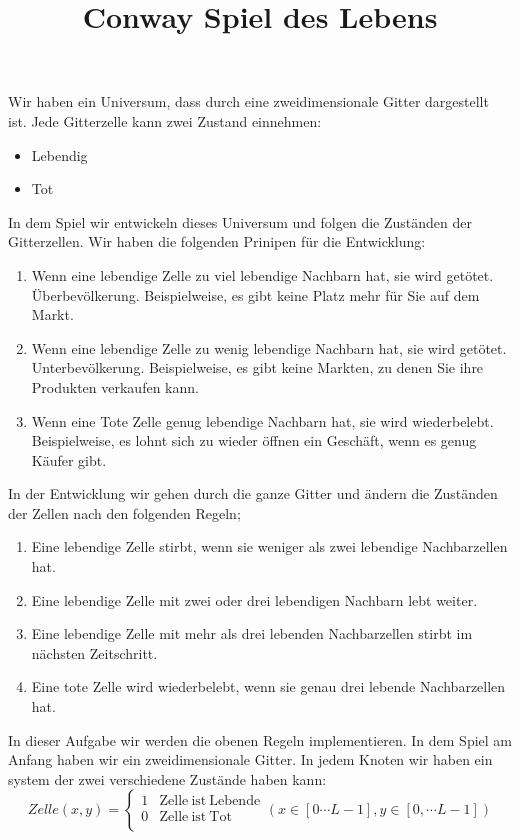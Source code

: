 \documentclass{article}[12pt]
\title{Conway Spiel des Lebens}
\begin{document}
\maketitle
Wir haben ein Universum, dass durch eine zweidimensionale Gitter dargestellt ist. Jede Gitterzelle kann 
zwei Zustand einnehmen:
\begin{itemize}
\item Lebendig
\item Tot
\end{itemize}
In dem Spiel wir entwickeln dieses Universum und folgen die Zuständen der Gitterzellen.
Wir haben die folgenden Prinipen für die Entwicklung:
\begin{enumerate}
\item Wenn eine lebendige Zelle zu viel lebendige Nachbarn hat, sie wird getötet. Überbevölkerung. Beispielweise, es gibt keine
Platz mehr für Sie auf dem Markt.
\item Wenn eine lebendige Zelle zu wenig lebendige Nachbarn hat, sie wird getötet. Unterbevölkerung. Beispielweise, es gibt keine Markten, 
zu denen Sie ihre Produkten verkaufen kann.
\item Wenn eine Tote Zelle genug lebendige Nachbarn hat, sie wird wiederbelebt. Beispielweise, es lohnt sich zu wieder öffnen ein Geschäft, wenn 
es genug Käufer gibt. 
\end{enumerate}
In der Entwicklung wir gehen durch die ganze Gitter und ändern die Zuständen der Zellen nach den folgenden Regeln;
\begin{enumerate}
\item Eine lebendige Zelle stirbt, wenn sie weniger als zwei lebendige Nachbarzellen hat.
\item Eine lebendige Zelle mit zwei oder drei lebendigen Nachbarn lebt weiter.
\item Eine lebendige Zelle mit mehr als drei lebenden Nachbarzellen stirbt im nächsten Zeitschritt.
\item Eine tote Zelle wird wiederbelebt, wenn sie genau drei lebende Nachbarzellen hat.
\end{enumerate}
In dieser Aufgabe wir werden die obenen Regeln implementieren. In dem Spiel am Anfang haben wir ein zweidimensionale Gitter. In jedem Knoten wir haben
ein system der zwei verschiedene Zustände haben kann:
\begin{equation}
Zelle(x,y) = \left\{\begin{array}{rc} 1 & \mathrm{Zelle~ist~Lebende} \\0  & \mathrm{Zelle~ist~Tot} \\
\end{array}\right. (x\in[0\cdots L-1], y\in[0,\cdots L-1])
\end{equation}
\end{document}
